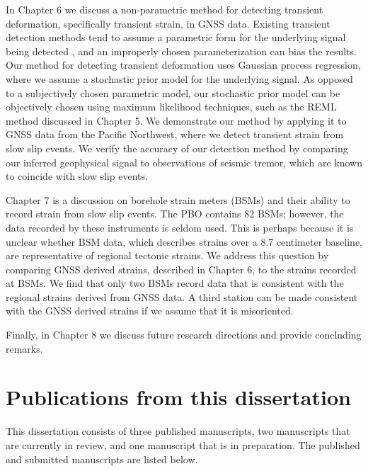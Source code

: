 In Chapter 6 we discuss a non-parametric method for detecting
transient deformation, specifically transient strain, in GNSS data.
Existing transient detection methods tend to assume a parametric form
for the underlying signal being detected \citep[e.g.,][]{Ohtani2010},
and an improperly chosen parameterization can bias the results. Our
method for detecting transient deformation uses Gaussian process
regression, where we assume a stochastic prior model for the
underlying signal. As opposed to a subjectively chosen parametric
model, our stochastic prior model can be objectively chosen using
maximum likelihood techniques, such as the REML method discussed in
Chapter 5. We demonstrate our method by applying it to GNSS data from
the Pacific Northwest, where we detect transient strain from slow slip
events. We verify the accuracy of our detection method by comparing
our inferred geophysical signal to observations of seismic tremor,
which are known to coincide with slow slip events.

Chapter 7 is a discussion on borehole strain meters (BSMs) and their
ability to record strain from slow slip events. The PBO contains 82
BSMs; however, the data recorded by these instruments is seldom used.
This is perhaps because it is unclear whether BSM data, which
describes strains over a 8.7 centimeter baseline, are representative
of regional tectonic strains. We address this question by comparing
GNSS derived strains, described in Chapter 6, to the strains recorded
at BSMs. We find that only two BSMs record data that is consistent
with the regional strains derived from GNSS data. A third station can
be made consistent with the GNSS derived strains if we assume that it
is misoriented.

Finally, in Chapter 8 we discuss future research directions and
provide concluding remarks.

\section{Publications from this dissertation}
This dissertation consists of three published manuscripts, two
manuscripts that are currently in review, and one manuscript that is
in preparation. The published and submitted manuscripts are listed
below.


